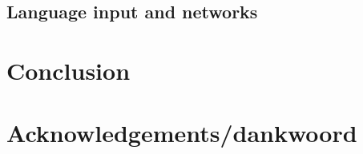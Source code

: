 \documentclass[12pt]{article}
\let\stdsection\section
\renewcommand\section{\newpage\stdsection}
\begin{document}
\subsection{Language input and networks}

\section{Conclusion}


\section*{Acknowledgements/dankwoord}

\end{document}
